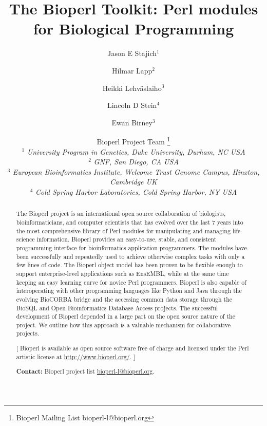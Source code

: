 \documentclass[12pt]{article}
\begin{document}
\doublespacing

\title{The Bioperl Toolkit: Perl modules for Biological Programming}
\author{Jason E Stajich$^1$ \and
Hilmar Lapp$^2$ \and
Heikki Lehv\"{a}slaiho$^3$ \and 
Lincoln D Stein$^4$ \and Ewan Birney$^3$ \and
Bioperl Project Team \thanks{Bioperl Mailing List bioperl-l@bioperl.org} \\
$^1$ \small{\textit{University Program in Genetics, Duke University,  Durham, NC USA}} \\
$^2$ \small{\textit{GNF, San Diego, CA USA}} \\
$^3$ \small{\textit{European Bioinformatics Institute, Welcome Trust
Genome Campus, Hinxton, Cambridge UK}} \\
$^4$ \small{\textit{Cold Spring Harbor Laboratories, Cold Spring Harbor, NY USA }}\\
}
\maketitle
\begin{abstract}

The Bioperl project is an international open source collaboration of
biologists, bioinformaticians, and computer scientists that has
evolved over the last 7 years into the most comprehensive library of
Perl modules for manipulating and managing life science information.
Bioperl provides an easy-to-use, stable, and consistent programming
interface for bioinformatics application programmers.  The modules
have been successfully and repeatedly used to achieve otherwise
complex tasks with only a few lines of code.  The Bioperl object model
has been proven to be flexible enough to support enterprise-level
applications such as EnsEMBL, while at the same time keeping an easy
learning curve for novice Perl programmers.  Bioperl is also capable
of interoperating with other programming languages like Python and
Java through the evolving BioCORBA bridge and the accessing common
data storage through the BioSQL and Open Bioinformatics Database
Access projects.  The successful development of Bioperl depended in a
large part on the open source nature of the project.  We outline how
this approach is a valuable mechanism for collaborative projects.

[ Bioperl is available as open source software free of charge and
licensed under the Perl artistic license at \url{http://www.bioperl.org/}. ]

\textbf{Contact:} Bioperl project list \url{bioperl-l@bioperl.org}.

\end{abstract}
\end{document}
